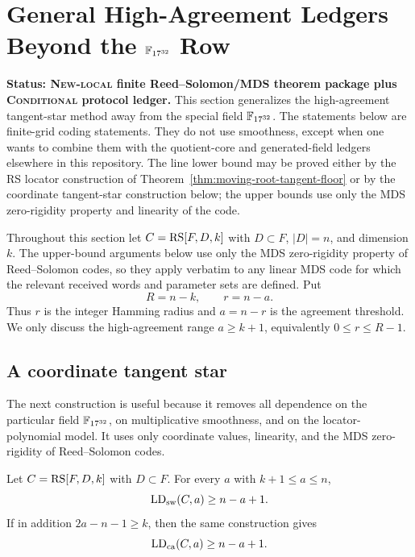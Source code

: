 
\section{General High-Agreement Ledgers Beyond the \texorpdfstring{$\mathbb F_{17^{32}}$}{F17^32} Row}
\label{sec:general-high-agreement-ledgers}

\textbf{Status: \textsc{New-local} finite Reed--Solomon/MDS theorem package plus
\textsc{Conditional} protocol ledger.}
This section generalizes the high-agreement tangent-star method away from the
special field \(\mathbb F_{17^{32}}\).  The statements below are finite-grid coding
statements.  They do not use smoothness, except when one wants to combine them
with the quotient-core and generated-field ledgers elsewhere in this repository.
The line lower bound may be proved either by the RS locator construction of
Theorem~\ref{thm:moving-root-tangent-floor} or by the coordinate tangent-star
construction below; the upper bounds use only the MDS zero-rigidity property and
linearity of the code.

Throughout this section let \(C=\operatorname{RS}[F,D,k]\) with \(D\subset F\), \(|D|=n\),
and dimension \(k\).  The upper-bound arguments below use only the MDS
zero-rigidity property of Reed--Solomon codes, so they apply verbatim to any
linear MDS code for which the relevant received words and parameter sets are
defined.  Put
\[
  R=n-k,
  \qquad r=n-a .
\]
Thus \(r\) is the integer Hamming radius and \(a=n-r\) is the agreement
threshold.  We only discuss the high-agreement range \(a\ge k+1\), equivalently
\(0\le r\le R-1\).

\subsection{A coordinate tangent star}

The next construction is useful because it removes all dependence on the
particular field \(\mathbb F_{17^{32}}\), on multiplicative smoothness, and on the
locator-polynomial model.  It uses only coordinate values, linearity, and the
MDS zero-rigidity of Reed--Solomon codes.

\begin{lemma}
\label{lem:coordinate-tangent-star}
Let \(C=\operatorname{RS}[F,D,k]\) with \(D\subset F\).  For every \(a\) with \(k+1\le a\le n\),
\[
  \operatorname{LD}_{\rm sw}(C,a)\ge n-a+1 .
\]
If in addition \(2a-n-1\ge k\), then the same construction gives
\[
  \operatorname{LD}_{\rm ca}(C,a)\ge n-a+1 .
\]
\end{lemma}

